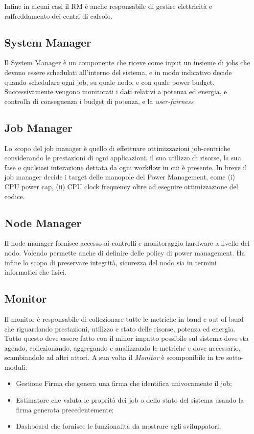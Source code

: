 Infine in alcuni casi il RM è anche responsabile di gestire elettricità e raffreddamento dei centri di calcolo.

\subsection{System Manager}
Il System Manager è un componente che riceve come input un insieme di jobs che devono essere schedulati all'interno del sistema, e in modo indicativo decide quando schedulare ogni job, su quale nodo, e con quale power budget. Successivamente vengono monitorati i dati relativi a potenza ed energia, e controlla di conseguenza i budget di potenza, e la \emph{user-fairness}

\subsection{Job Manager}
Lo scopo del job manager è quello di effettuare ottimizzazioni job-centriche considerando le prestazioni di ogni applicazioni, il suo utilizzo di risorse, la sua fase e qualsiasi interazione dettata da ogni workflow in cui è presente. In breve il job manager decide i target delle manopole del Power Management, come (i) CPU power cap, (ii) CPU clock frequency oltre ad eseguire ottimizzazione del codice.

\subsection{Node Manager}
Il node manager fornisce accesso ai controlli e monitoraggio hardware a livello del nodo. Volendo permette anche di definire delle policy di power management. Ha infine lo scopo di preservare integrità, sicurezza del nodo sia in termini informatici che fisici.

\subsection{Monitor}

Il monitor è responsabile di collezionare tutte le metriche in-band e out-of-band che riguardando prestazioni, utilizzo e stato delle risorse, potenza ed energia.
Tutto questo deve essere fatto con il minor impatto possibile sul sistema dove sta agendo, collezionando, aggregando e analizzando le metriche e dove necessario, scambiandole ad altri attori. A sua volta il \emph{Monitor} è scomponibile in tre sotto-moduli:
\begin{itemize}
    \item Gestione Firma che genera una firma che identifica univocamente il job; 
    \item Estimatore che valuta le proprità dei job o dello stato del sistema usando la firma generata precedentemente;
    \item Dashboard che fornisce le funzionalità da mostrare agli sviluppatori.
\end{itemize}


